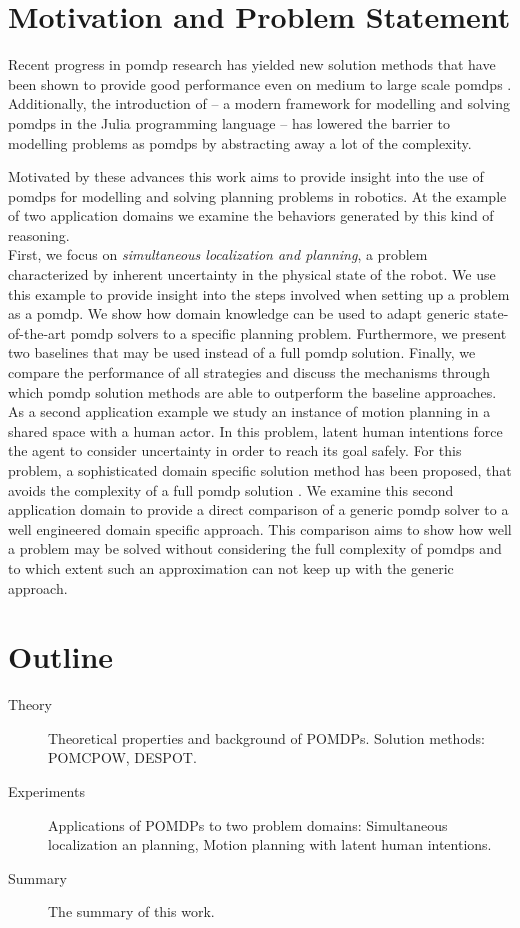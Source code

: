 \section{Motivation and Problem Statement}

Recent progress in \ac{pomdp} research has yielded new solution methods that
have been shown to provide good performance even on medium to large scale
\acp{pomdp} \cite{somani2013despot,sunberg2018online}. Additionally, the
introduction of \pomdpsjl \cite{egorov2017pomdps} -- a modern framework for
modelling and solving \acp{pomdp} in the Julia programming language -- has
lowered the barrier to modelling problems as \acp{pomdp} by abstracting away
a lot of the complexity.

Motivated by these advances this work aims to provide insight into the use of
\acp{pomdp} for modelling and solving planning problems in robotics. At the
example of two application domains we examine the behaviors generated by this
kind of reasoning.\\
First, we focus on \emph{simultaneous localization and
planning}, a problem characterized by inherent uncertainty in the physical
state of the robot. We use this example to provide insight into the steps
involved when setting up a problem as a \ac{pomdp}. We show how
domain knowledge can be used to adapt generic state-of-the-art \ac{pomdp}
solvers to a specific planning problem. Furthermore, we present two baselines
that may be used instead of a full \ac{pomdp} solution. Finally, we compare the
performance of all strategies and discuss the mechanisms through which
\ac{pomdp} solution methods are able to outperform the baseline approaches.\\
As a second application example we study an instance of motion planning in
a shared space with a human actor. In this problem, latent human intentions
force the agent to consider uncertainty in order to reach its goal safely. For
this problem, a sophisticated domain specific solution method has been
proposed, that avoids the complexity of a full \ac{pomdp} solution
\cite{fisac2018probabilistically}. We examine this second application domain to
provide a direct comparison of a generic \ac{pomdp} solver to a well engineered
domain specific approach. This comparison aims to show how well a problem may
be solved without considering the full complexity of \acp{pomdp} and to which
extent such an approximation can not keep up with the generic approach.

\section{Outline}

\begin{description}
  \item[Theory] Theoretical properties and background of POMDPs. Solution methods: POMCPOW, DESPOT.
  \item[Experiments] Applications of POMDPs to two problem domains: Simultaneous localization an planning, Motion planning with latent human intentions.
  \item[Summary] The summary of this work.
\end{description}
